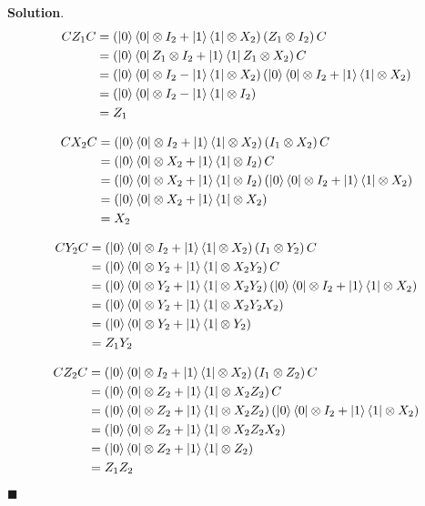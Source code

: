 \documentclass[12pt]{article}
\theoremstyle{definition}
\newenvironment{s}{%
        \begin{trivlist} \item \textbf{Solution}. }{%
            \hspace*{\fill} $\blacksquare$\end{trivlist}}%
\begin{document}
{\begin{s}
\begin{align*}
CZ_{1}C &= \left(\ket{0}\bra{0} \otimes I_{2} + \ket{1}\bra{1}\otimes X_{2}\right)\left(Z_{1}\otimes I_{2}\right) C\\
&= \left(\ket{0}\bra{0}Z_{1} \otimes I_{2} + \ket{1}\bra{1}Z_{1}\otimes X_{2}\right)C\\
&= \left(\ket{0}\bra{0} \otimes I_{2} - \ket{1}\bra{1}\otimes X_{2}\right)\left(\ket{0}\bra{0} \otimes I_{2} + \ket{1}\bra{1}\otimes X_{2}\right)\\
&= \left(\ket{0}\bra{0}\otimes I_{2} - \ket{1}\bra{1} \otimes I_{2}\right)\\
&= Z_{1}
\end{align*}

\begin{align*}
CX_{2}C &= \left(\ket{0}\bra{0} \otimes I_{2} + \ket{1}\bra{1}\otimes X_{2}\right)\left(I_{1}\otimes X_{2}\right) C\\
&= \left(\ket{0}\bra{0} \otimes X_{2} + \ket{1}\bra{1}\otimes I_{2}\right)C\\
&= \left(\ket{0}\bra{0} \otimes X_{2} + \ket{1}\bra{1}\otimes I_{2}\right)\left(\ket{0}\bra{0} \otimes I_{2} + \ket{1}\bra{1}\otimes X_{2}\right)\\
&= \left(\ket{0}\bra{0}\otimes X_{2} + \ket{1}\bra{1} \otimes X_{2}\right)\\
&= X_{2}
\end{align*}

\begin{align*}
CY_{2}C &= \left(\ket{0}\bra{0} \otimes I_{2} + \ket{1}\bra{1}\otimes X_{2}\right)\left(I_{1}\otimes Y_{2}\right) C\\
&= \left(\ket{0}\bra{0} \otimes Y_{2} + \ket{1}\bra{1}\otimes X_{2}Y_{2}\right)C\\
&= \left(\ket{0}\bra{0} \otimes Y_{2} + \ket{1}\bra{1}\otimes X_{2}Y_{2}\right)\left(\ket{0}\bra{0} \otimes I_{2} + \ket{1}\bra{1}\otimes X_{2}\right)\\
&= \left(\ket{0}\bra{0}\otimes Y_{2} + \ket{1}\bra{1} \otimes X_{2}Y_{2}X_{2}\right)\\
&= \left(\ket{0}\bra{0}\otimes Y_{2} + \ket{1}\bra{1} \otimes Y_{2}\right)\\
&= Z_{1}Y_{2}
\end{align*}

\begin{align*}
CZ_{2}C &= \left(\ket{0}\bra{0} \otimes I_{2} + \ket{1}\bra{1}\otimes X_{2}\right)\left(I_{1}\otimes Z_{2}\right) C\\
&= \left(\ket{0}\bra{0} \otimes Z_{2} + \ket{1}\bra{1}\otimes X_{2}Z_{2}\right)C\\
&= \left(\ket{0}\bra{0} \otimes Z_{2} + \ket{1}\bra{1}\otimes X_{2}Z_{2}\right)\left(\ket{0}\bra{0} \otimes I_{2} + \ket{1}\bra{1}\otimes X_{2}\right)\\
&= \left(\ket{0}\bra{0}\otimes Z_{2} + \ket{1}\bra{1} \otimes X_{2}Z_{2}X_{2}\right)\\
&= \left(\ket{0}\bra{0}\otimes Z_{2} + \ket{1}\bra{1} \otimes Z_{2}\right)\\
&= Z_{1}Z_{2}
\end{align*}

\end{s}
\end{document}
